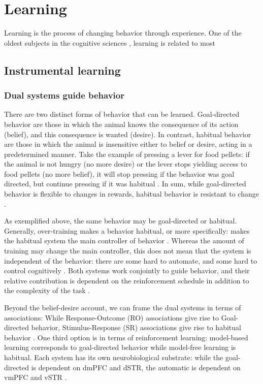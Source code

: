\chapter{Learning}
    Learning is the process of changing behavior through experience. One of the oldest subjects in the cognitive sciences \cite{}, learning is related to most 
    
\section{Instrumental learning}
    
        
    \subsection{Dual systems guide behavior}
        There are two distinct forms of behavior that can be learned. Goal-directed behavior are those in which the animal knows the consequence of its action (belief), and this consequence is wanted (desire). In contrast, habitual behavior are those in which the animal is insensitive either to belief or desire, acting in a predetermined manner. Take the example of pressing a lever for food pellets: if the animal is not hungry (no more desire) or the lever stops yielding access to food pellets (no more belief), it will stop pressing if the behavior was goal directed, but continue pressing if it was habitual \cite{}. In sum, while goal-directed behavior is flexible to changes in rewards, habitual behavior is resistant to change \cite{}.
        
        As exemplified above, the same behavior may be goal-directed or habitual. Generally, over-training makes a behavior habitual, or more specifically: makes the habitual system the main controller of behavior \cite{}. Whereas the amount of training may change the main controller, this does not mean that the system is independent of the behavior: there are some hard to automate, and some hard to control cognitively \cite{}. Both systems work conjointly to guide behavior, and their relative contribution is dependent on the reinforcement schedule in addition to the complexity of the task \cite{dickinson2015instrumental}.
        
        Beyond the belief-desire account, we can frame the dual systems in terms of associations: While Response-Outcome (RO) associations give rise to Goal-directed behavior, Stimulus-Response (SR) associations give rise to habitual behavior \cite{}. One third option is in terms of reinforcement learning: model-based learning corresponds to goal-directed behavior while model-free learning is habitual. 
        Each system has its own neurobiological substrate: while the goal-directed is dependent on dmPFC and dSTR, the automatic is dependent on vmPFC and vSTR \cite{dickinson2015instrumental}. 

